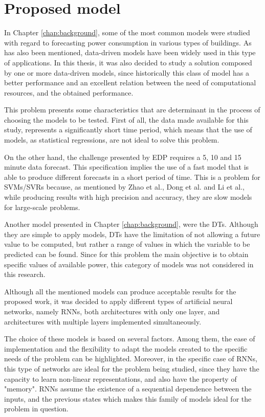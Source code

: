 \section{Proposed model}\label{chap3:sec:proposed_model}

In Chapter \ref{chap:background}, some of the most common models were studied with regard to forecasting power consumption in various types of buildings. As has also been mentioned, data-driven models have been widely used in this type of applications. In this thesis, it was also decided to study a solution composed by one or more data-driven models, since historically this class of model has a better performance and an excellent relation between the need of computational resources, and the obtained performance.

This problem presents some characteristics that are determinant in the process of choosing the models to be tested. First of all, the data made available for this study, represents a significantly short time period, which means that the use of models, as statistical regressions, are not ideal to solve this problem. 

On the other hand, the challenge presented by \ac{EDP} requires a 5, 10 and 15 minute data forecast. This specification implies the use of a fast model that is able to produce different forecasts in a short period of time. This is a problem for \ac{SVM}s/\ac{SVR}s because, as mentioned by Zhao et al.\cite{svm3}, Dong et al.\cite{svm2} and Li et al.\cite{svm5}, while producing results with high precision and accuracy, they are slow models for large-scale problems. 

Another model presented in Chapter \ref{chap:background}, were the \acf{DT}s. Although they are simple to apply models, \ac{DT}s have the limitation of not allowing a future value to be computed, but rather a range of values in which the variable to be predicted can be found. Since for this problem the main objective is to obtain specific values of available power, this category of models was not considered in this research.

Although all the mentioned models can produce acceptable results for the proposed work, it was decided to apply different types of artificial neural networks, namely \ac{RNN}s, both architectures with only one layer, and architectures with multiple layers implemented simultaneously. 

The choice of these models is based on several factors. Among them, the ease of implementation and the flexibility to adapt the models created to the specific needs of the problem can be highlighted. Moreover, in the specific case of \ac{RNN}s, this type of networks are ideal for the problem being studied, since they have the capacity to learn non-linear representations, and also have the property of "memory". \ac{RNN}s assume the existence of a sequential dependence between the inputs, and the previous states which makes this family of models ideal for the problem in question. 

